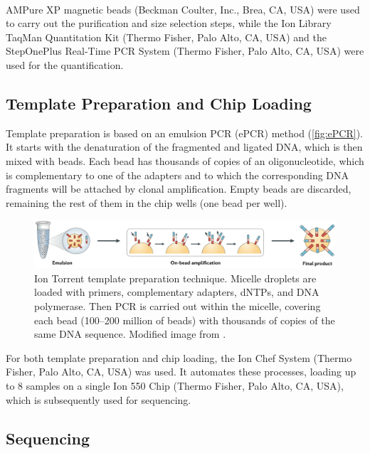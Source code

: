 AMPure XP\textsuperscript\textregistered{} magnetic beads (Beckman Coulter, Inc., Brea, CA, USA) were used to carry out the purification and size selection steps, while the Ion Library TaqMan\texttrademark{} Quantitation Kit (Thermo Fisher, Palo Alto, CA, USA) and the StepOnePlus\texttrademark{} Real-Time PCR System (Thermo Fisher, Palo Alto, CA, USA) were used for the quantification.

\subsection{Template Preparation and Chip Loading}

Template preparation is based on an emulsion PCR (ePCR) method (\autoref{fig:ePCR}). It starts with the denaturation of the fragmented and ligated DNA, which is then mixed with beads. Each bead has thousands of copies of an oligonucleotide, which is complementary to one of the adapters and to which the corresponding DNA fragments will be attached by clonal amplification. Empty beads are discarded, remaining the rest of them in the chip wells (one bead per well).

\begin{figure}[ht]
    \centering
    \includegraphics[width=\textwidth]{Images/chapter_3/ePCR.png}
    \caption{Ion Torrent\texttrademark{} template preparation technique. Micelle droplets are loaded with primers, complementary adapters, dNTPs, and DNA polymerase. Then PCR is carried out within the micelle, covering each bead (100–200 million of beads) with thousands of copies of the same DNA sequence. Modified image from \cite{NGS}.}
    \label{fig:ePCR}
\end{figure}

For both template preparation and chip loading, the Ion Chef\texttrademark{} System (Thermo Fisher, Palo Alto, CA, USA) was used. It automates these processes, loading up to 8 samples on a single Ion 550\texttrademark{} Chip (Thermo Fisher, Palo Alto, CA, USA), which is subsequently used for sequencing.

\subsection{Sequencing}

